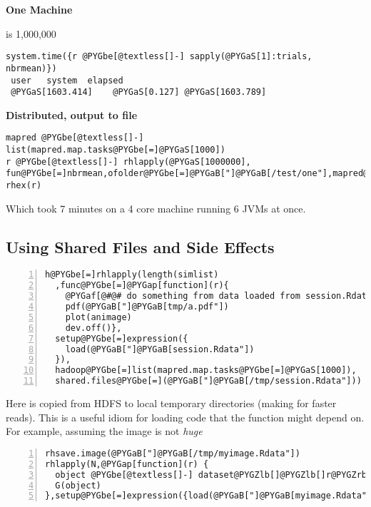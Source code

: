\documentclass[letterpaper,10pt,english]{manual}
\begin{document}
\textbf{One Machine}

 is 1,000,000

\begin{Verbatim}[commandchars=@\[\]]
system.time({r @PYGbe[@textless[]-] sapply(@PYGaS[1]:trials, nbrmean)})
 user   system  elapsed
 @PYGaS[1603.414]    @PYGaS[0.127] @PYGaS[1603.789]
\end{Verbatim}

\textbf{Distributed, output to file}

\begin{Verbatim}[commandchars=@\[\]]
mapred @PYGbe[@textless[]-] list(mapred.map.tasks@PYGbe[=]@PYGaS[1000])
r @PYGbe[@textless[]-] rhlapply(@PYGaS[1000000], fun@PYGbe[=]nbrmean,ofolder@PYGbe[=]@PYGaB["]@PYGaB[/test/one"],mapred@PYGbe[=]mapred)
rhex(r)
\end{Verbatim}

Which took 7 minutes on a 4 core machine running 6 JVMs at once.


\subsection{Using Shared Files and Side Effects}

\begin{Verbatim}[commandchars=@\[\],numbers=left,firstnumber=1,stepnumber=1]
h@PYGbe[=]rhlapply(length(simlist)
  ,func@PYGbe[=]@PYGap[function](r){
    @PYGaf[@#@# do something from data loaded from session.Rdata]
    pdf(@PYGaB["]@PYGaB[tmp/a.pdf"])
    plot(animage)
    dev.off()},
  setup@PYGbe[=]expression({
    load(@PYGaB["]@PYGaB[session.Rdata"])
  }),
  hadoop@PYGbe[=]list(mapred.map.tasks@PYGbe[=]@PYGaS[1000]),
  shared.files@PYGbe[=](@PYGaB["]@PYGaB[/tmp/session.Rdata"]))
\end{Verbatim}

Here  is copied from HDFS to local temporary directories (making for faster reads). This
is a useful idiom for loading code that the  function might depend on. For example, assuming the image is not \emph{huge}

\begin{Verbatim}[commandchars=@\[\],numbers=left,firstnumber=1,stepnumber=1]
rhsave.image(@PYGaB["]@PYGaB[/tmp/myimage.Rdata"])
rhlapply(N,@PYGap[function](r) {
  object @PYGbe[@textless[]-] dataset@PYGZlb[]@PYGZlb[]r@PYGZrb[]@PYGZrb[]
  G(object)
},setup@PYGbe[=]expression({load(@PYGaB["]@PYGaB[myimage.Rdata"])}))
\end{Verbatim}
\end{document}
